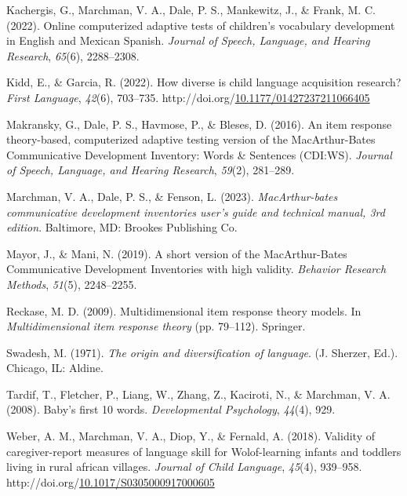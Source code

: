 \documentclass[10pt, letterpaper]{article}
\begin{document}
\leavevmode{}%
Kachergis, G., Marchman, V. A., Dale, P. S., Mankewitz, J., \& Frank, M.
C. (2022). Online computerized adaptive tests of children's vocabulary
development in {English} and {Mexican Spanish}. \emph{Journal of Speech,
Language, and Hearing Research}, \emph{65}(6), 2288--2308.

\leavevmode{}%
Kidd, E., \& Garcia, R. (2022). How diverse is child language
acquisition research? \emph{First Language}, \emph{42}(6), 703--735.
http://doi.org/\href{https://doi.org/10.1177/01427237211066405}{10.1177/01427237211066405}

\leavevmode{}%
Makransky, G., Dale, P. S., Havmose, P., \& Bleses, D. (2016). An item
response theory-based, computerized adaptive testing version of the
{M}ac{A}rthur-{B}ates {C}ommunicative {D}evelopment {I}nventory: {W}ords
\& {S}entences ({CDI:WS}). \emph{Journal of Speech, Language, and
Hearing Research}, \emph{59}(2), 281--289.

\leavevmode{}%
Marchman, V. A., Dale, P. S., \& Fenson, L. (2023).
\emph{MacArthur-bates communicative development inventories user's guide
and technical manual, 3rd edition}. Baltimore, MD: Brookes Publishing
Co.

\leavevmode{}%
Mayor, J., \& Mani, N. (2019). A short version of the
{M}ac{A}rthur-{B}ates {C}ommunicative {D}evelopment {I}nventories with
high validity. \emph{Behavior Research Methods}, \emph{51}(5),
2248--2255.

\leavevmode{}%
Reckase, M. D. (2009). Multidimensional item response theory models. In
\emph{Multidimensional item response theory} (pp. 79--112). Springer.

\leavevmode{}%
Swadesh, M. (1971). \emph{The origin and diversification of language}.
(J. Sherzer, Ed.). Chicago, IL: Aldine.

\leavevmode{}%
Tardif, T., Fletcher, P., Liang, W., Zhang, Z., Kaciroti, N., \&
Marchman, V. A. (2008). Baby's first 10 words. \emph{Developmental
Psychology}, \emph{44}(4), 929.

\leavevmode{}%
Weber, A. M., Marchman, V. A., Diop, Y., \& Fernald, A. (2018). Validity
of caregiver-report measures of language skill for {Wolof}-learning
infants and toddlers living in rural african villages. \emph{Journal of
Child Language}, \emph{45}(4), 939--958.
http://doi.org/\href{https://doi.org/10.1017/S0305000917000605}{10.1017/S0305000917000605}


\end{document}
